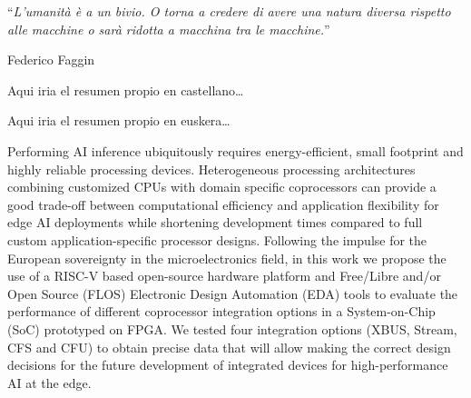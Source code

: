 \documentclass[
11pt, %
spanish, %
singlespacing, %
headsepline, %
]{MastersDoctoralThesis} %
\begin{document}
\let\cleardoublepage\clearpage 


\vspace*{0.2\textheight}

\noindent\enquote{\itshape L'umanità è a un bivio. O torna a credere di avere una natura diversa rispetto alle macchine o sarà ridotta a macchina tra le macchine.}\bigbreak

\hfill Federico Faggin


\begin{Resumen}
\addchaptertocentry{\resumenname} %
Aqui iria el resumen propio en castellano\ldots
\end{Resumen}


\begin{Laburpena}
\addchaptertocentry{\resumennameeus} %
Aqui iria el resumen propio en euskera\ldots
\end{Laburpena}


\begin{Abstract}
\addchaptertocentry{\resumennamein} %
Performing AI inference ubiquitously requires energy-efficient, small footprint and highly reliable processing devices. 
Heterogeneous processing architectures combining customized CPUs with domain specific coprocessors can provide a good trade-off between computational efficiency and application flexibility for edge AI deployments while shortening development times compared to full custom application-specific processor designs. 
Following the impulse for the European sovereignty in the microelectronics field, in this work we propose the use of a RISC-V based open-source hardware platform and Free/Libre and/or Open Source (FLOS) Electronic Design Automation (EDA) tools to evaluate the performance of different coprocessor integration options in a System-on-Chip (SoC) prototyped on FPGA. 
We tested four integration options (XBUS, Stream, CFS and CFU) to obtain precise data that will allow making the correct design decisions for the future development of integrated devices for high-performance AI at the edge.
\end{Abstract}
\end{document}
